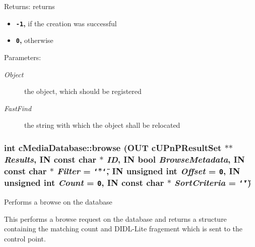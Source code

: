 \begin{Desc}
\item[Returns:]returns\begin{itemize}
\item {\bf {\tt -1},} if the creation was successful\item {\bf {\tt 0},} otherwise \end{itemize}
\end{Desc}
\begin{Desc}
\item[Parameters:]
\begin{description}
\item[{\em Object}]the object, which should be registered \item[{\em FastFind}]the string with which the object shall be relocated \end{description}
\end{Desc}
\hypertarget{classcMediaDatabase_25ff666113dbe72598e4ef4e23af5d8f}{
\subsubsection[{browse}]{\setlength{\rightskip}{0pt plus 5cm}int cMediaDatabase::browse (OUT {\bf cUPnPResultSet} $\ast$$\ast$ {\em Results}, \/  IN const char $\ast$ {\em ID}, \/  IN bool {\em BrowseMetadata}, \/  IN const char $\ast$ {\em Filter} = {\tt \char`\"{}$\ast$\char`\"{}}, \/  IN unsigned int {\em Offset} = {\tt 0}, \/  IN unsigned int {\em Count} = {\tt 0}, \/  IN const char $\ast$ {\em SortCriteria} = {\tt \char`\"{}\char`\"{}})}}
\label{classcMediaDatabase_25ff666113dbe72598e4ef4e23af5d8f}


Performs a browse on the database

This performs a browse request on the database and returns a structure containing the matching count and DIDL-Lite fragement which is sent to the control point.

